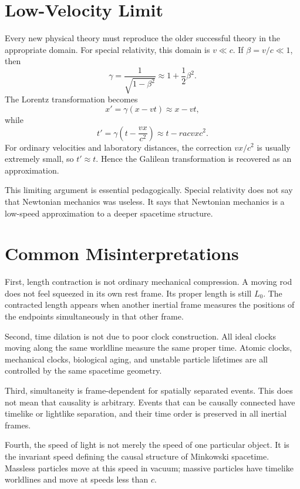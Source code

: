 \section{Low-Velocity Limit}

Every new physical theory must reproduce the older successful theory in the
appropriate domain. For special relativity, this domain is \(v\ll c\). If
\(\beta=v/c\ll 1\), then
\[
\gamma=\frac{1}{\sqrt{1-\beta^2}}
\approx 1+\frac{1}{2}\beta^2.
\]
The Lorentz transformation becomes
\[
x'=\gamma(x-vt)\approx x-vt,
\]
while
\[
t'=\gamma\left(t-\frac{vx}{c^2}\right)
\approx t-rac{vx}{c^2}.
\]
For ordinary velocities and laboratory distances, the correction \(vx/c^2\) is
usually extremely small, so \(t'\approx t\). Hence the Galilean transformation
is recovered as an approximation.

This limiting argument is essential pedagogically. Special relativity does not
say that Newtonian mechanics was useless. It says that Newtonian mechanics is a
low-speed approximation to a deeper spacetime structure.

\clearpage

\section{Common Misinterpretations}

First, length contraction is not ordinary mechanical compression. A moving rod
does not feel squeezed in its own rest frame. Its proper length is still
\(L_0\). The contracted length appears when another inertial frame measures the
positions of the endpoints simultaneously in that other frame.

Second, time dilation is not due to poor clock construction. All ideal clocks
moving along the same worldline measure the same proper time. Atomic clocks,
mechanical clocks, biological aging, and unstable particle lifetimes are all
controlled by the same spacetime geometry.

Third, simultaneity is frame-dependent for spatially separated events. This does
not mean that causality is arbitrary. Events that can be causally connected have
timelike or lightlike separation, and their time order is preserved in all
inertial frames.

Fourth, the speed of light is not merely the speed of one particular object. It
is the invariant speed defining the causal structure of Minkowski spacetime.
Massless particles move at this speed in vacuum; massive particles have timelike
worldlines and move at speeds less than \(c\).


